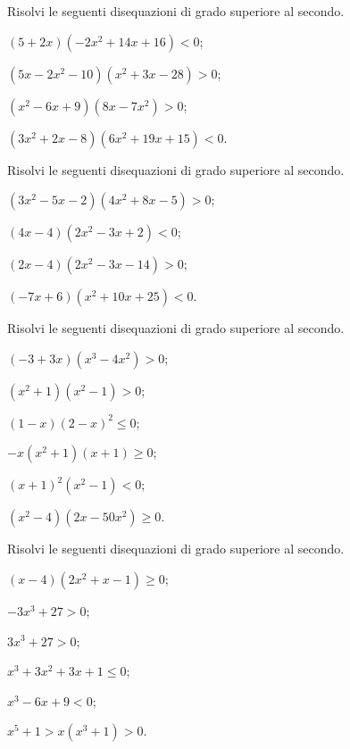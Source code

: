 \begin{esercizio}[\Ast]
 \label{ese:4.40}
Risolvi le seguenti disequazioni di grado superiore al secondo.
\begin{multicols}{2}
\begin{enumeratea}
\item $(5+2x)(-2x^2+14x+16)<0$;
\item $(5x-2x^2-10)(x^2+3x-28)>0$;
\item $(x^2-6x+9)(8x-7x^2)>0$;
\item $(3x^2+2x-8)(6x^2+19x+15)<0$.
\end{enumeratea}
\end{multicols}
\end{esercizio}
\pagebreak
\begin{esercizio}[\Ast]
 \label{ese:4.41}
Risolvi le seguenti disequazioni di grado superiore al secondo.
\begin{multicols}{2}
\begin{enumeratea}
\item $(3x^2-5x-2)(4x^2+8x-5)>0$;
\item $(4x-4)(2x^2-3x+2)<0$;
\item $(2x-4)(2x^2-3x-14)>0$;
\item $(-7x+6)(x^2+10x+25)<0$.
\end{enumeratea}
\end{multicols}
\end{esercizio}

\begin{esercizio}[\Ast]
 \label{ese:4.42}
Risolvi le seguenti disequazioni di grado superiore al secondo.
\begin{multicols}{2}
\begin{enumeratea}
\item $(-3+3x)(x^3-4x^2)>0$;
\item $\left(x^2+1\right)\left(x^2-1\right)>0$;
\item $(1-x)(2-x)^2\le 0$;
\item $-x\left(x^2+1\right)(x+1)\ge 0$;
\item $(x+1)^2\left(x^2-1\right)<0$;
\item $(x^2-4)(2x-50x^2)\ge 0$.
\end{enumeratea}
\end{multicols}
\end{esercizio}

\begin{esercizio}[\Ast]
 \label{ese:4.43}
Risolvi le seguenti disequazioni di grado superiore al secondo.
\begin{multicols}{2}
\begin{enumeratea}
\item $(x-4)(2x^2+x-1)\ge 0$;
\item $-3x^3+27>0$;
\item $3x^3+27>0$;
\item $x^3+3x^2+3x+1\le 0$;
\item $x^3-6x+9<0$;
\item $x^5+1>x\left(x^3+1\right)>0$.
\end{enumeratea}
\end{multicols}
\end{esercizio}


